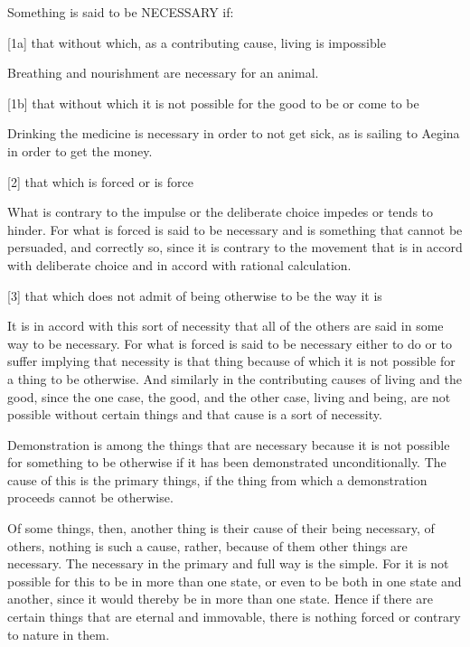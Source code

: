 Something is said to be NECESSARY if:

[1a]    that without which, as a contributing cause, living is impossible

        Breathing and nourishment are necessary for an animal.

[1b]    that without which it is not possible for the good to be or come to be

        Drinking the medicine is necessary in order to not get sick,
        as is sailing to Aegina in order to get the money.

[2]     that which is forced or is force

        What is contrary to the impulse or the deliberate choice
        impedes or tends to hinder. For what is forced is said to be
        necessary and is something that cannot be persuaded,
        and correctly so, since it is contrary to the movement
        that is in accord with deliberate choice
        and in accord with rational calculation.

[3]     that which does not admit of being otherwise to be the way it is

        It is in accord with this sort of necessity that all of the others
        are said in some way to be necessary. For what is forced is said to be necessary
        either to do or to suffer implying that necessity is that thing because of which
        it is not possible for a thing to be otherwise. And similarly in the contributing
        causes of living and the good, since the one case, the good, and the other case,
        living and being, are not possible without certain things
        and that cause is a sort of necessity.

        Demonstration is among the things that are necessary
        because it is not possible for something to be otherwise
        if it has been demonstrated unconditionally.
        The cause of this is the primary things,
        if the thing from which a demonstration proceeds cannot be otherwise.

Of some things, then, another thing is their
cause of their being necessary,
of others, nothing is such a cause, rather,
because of them other things are necessary.
The necessary in the primary and full way is the simple.
For it is not possible for this to be in more than one state,
or even to be both in one state and another,
since it would thereby be in more than one state.
Hence if there are certain things that are eternal and immovable,
there is nothing forced or contrary to nature in them.
